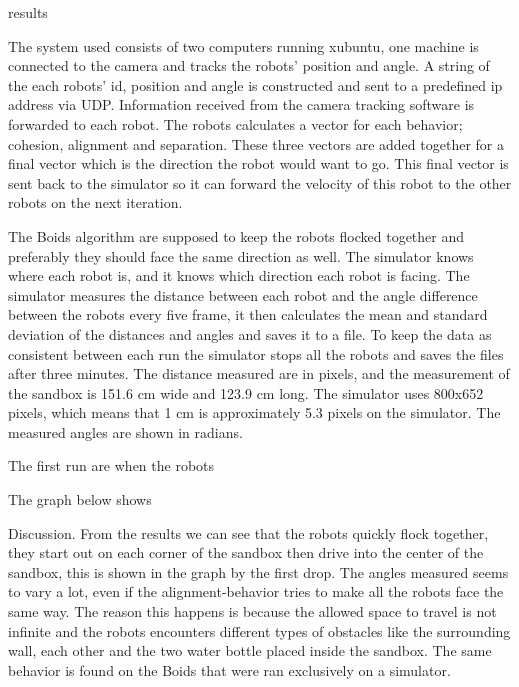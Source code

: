 results

The system used consists of two computers running xubuntu, one machine is connected to the camera and tracks the robots' position and angle. A string of the each robots' id, position and angle is constructed and sent to a predefined ip address via UDP. Information received from the camera tracking software is forwarded to each robot. The robots calculates a vector for each behavior; cohesion, alignment and separation. These three vectors are added together for a final vector which is the direction the robot would want to go. This final vector is sent back to the simulator so it can forward the velocity of this robot to the other robots on the next iteration.

The Boids algorithm are supposed to keep the robots flocked together and preferably they should face the same direction as well. The simulator knows where each robot is, and it knows which direction each robot is facing. The simulator measures the distance between each robot and the angle difference between the robots every five frame, it then calculates the mean and standard deviation of the distances and angles and saves it to a file.
To keep the data as consistent between each run the simulator stops all the robots and saves the files after three minutes.
The distance measured are in pixels, and the measurement of the sandbox is 151.6 cm wide and 123.9 cm long. The simulator uses 800x652 pixels, which means that 1 cm is approximately 5.3 pixels on the simulator. The measured angles are shown in radians.


The first run are when the robots 

The graph below shows





Discussion.
From the results we can see that the robots quickly flock together, they start out on each corner of the sandbox then drive into the center of the sandbox, this is shown in the graph by the first drop. 
The angles measured seems to vary a lot, even if the alignment-behavior tries to make all the robots face the same way. The reason this happens is because the allowed space to travel is not infinite and the robots encounters different types of obstacles like the surrounding wall, each other and the two water bottle placed inside the sandbox. The same behavior is found on the Boids that were ran exclusively on a simulator.